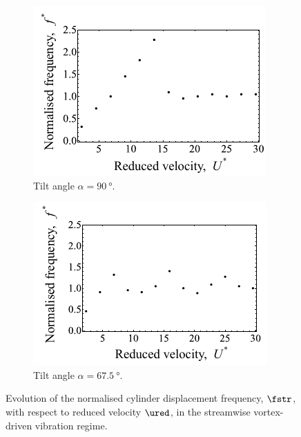 \documentclass[a4paper,fleqn]{cas-sc}
\begin{document}
\begin{figure}
  \centering
  \begin{subfigure}[h]{0.35\textwidth}
    \includegraphics[width=\textwidth]{figs/yStrFreq5}
    \caption{Tilt angle $\alpha = \SI{90}{\degree}$.}
    \label{fig:yStrFreq5}
  \end{subfigure}

  \begin{subfigure}[h]{0.35\textwidth}
    \includegraphics[width=\textwidth]{figs/yStrFreq4}
    \caption{Tilt angle $\alpha = \SI{67.5}{\degree}$.}
    \label{fig:yStrFreq4}
  \end{subfigure}
  \caption{Evolution of the normalised cylinder displacement frequency, $\fstr$, with respect to reduced velocity $\ured$, in the streamwise vortex-driven vibration regime.} \label{fig:yStrFreqStreamwise}
\end{figure}
\end{document}
